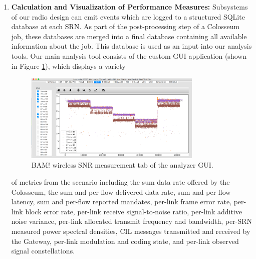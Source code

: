 \documentclass[11pt]{article}
\begin{document}
\begin{enumerate}
     \item \textbf{Calculation and Visualization of Performance Measures:}
     Subsystems of our radio design can emit events which are logged to a structured SQLite database at each SRN. As part of the post-processing step of a Colosseum job, these databases are merged into a final database containing all available information about the job. This database is used as an input into our analysis tools. Our main analysis tool consists of the custom GUI application (shown in Figure \ref{fg:GUI}), which displays a variety \begin{figure} [htb]
     \centerline{
     \includegraphics[width = 0.8\textwidth]{Figures/GUI.png}}
     \caption{BAM! wireless SNR measurement tab of the analyzer GUI.}
     \label{fg:GUI}
     \end{figure}
     of metrics from the scenario including the sum data rate offered by the Colosseum, the sum and per-flow delivered data rate, sum and per-flow latency, sum and per-flow reported mandates, per-link frame error rate, per-link block error rate, per-link receive signal-to-noise ratio, per-link additive noise variance, per-link allocated transmit frequency and bandwidth, per-SRN measured power spectral densities, CIL messages transmitted and received by the Gateway, per-link modulation and coding state, and per-link observed signal constellations.
     

\end{enumerate}
\end{document}
